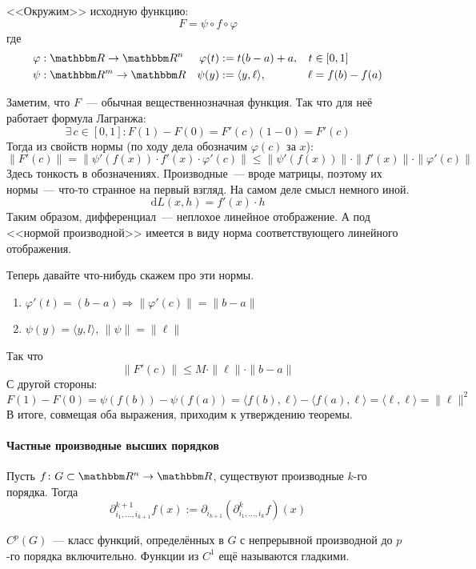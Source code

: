 \documentclass[12pt,timbord]{../../../notes}
\begin{document}
\begin{ittproof}
  <<Окружим>>  исходную функцию:
  \[
    F = \psi \circ f \circ \varphi
  \]
  где 
  \begin{align*}
    \varphi&: \R \to \R^n & \varphi(t) &:= t(b-a) + a, & t&\in [0,1] \\
    \psi&: \R^m \to \R & \psi(y) &:= \langle y, \ell \rangle, & \ell &= f(b)-f(a) 
  \end{align*}
  
  Заметим, что $F$~--- обычная вещественнозначная функция. Так что для неё работает формула
  Лагранжа:
  \[
    \exists\, c \in [0,1] \colon F(1)-F(0) = F'(c)(1-0) = F'(c)
  \]
  Тогда из свойств нормы (по ходу дела обозначим $\varphi(c)$ за $x$):
  \[
    \|F'(c)\| = \|\psi'(f(x)) \cdot f'(x) \cdot \varphi'(c)\| \leqslant 
    \|\psi'(f(x)) \| \cdot \| f'(x) \| \cdot \| \varphi'(c)\|
  \]
  Здесь тонкость в обозначениях. Производные~--- вроде матрицы, поэтому их нормы~--- что-то
  странное на первый взгляд. На самом деле смысл немного иной. 
  \[
    \mathrm d L(x, h) = f'(x) \cdot h
  \]
  Таким образом, дифференциал~--- неплохое линейное отображение. А под <<нормой производной>>
  имеется в виду норма соответствующего линейного отображения.

  Теперь давайте что-нибудь скажем про эти нормы. 

  \begin{enumerate}
    \item $\varphi'(t) = (b-a) \Rightarrow \| \varphi'(c) \| = \| b - a\|$
    \item $\psi(y) = \langle y, l \rangle$, $\| \psi\| = \|\ell\|$      
  \end{enumerate}
  Так что 
  \[
    \| F'(c)\| \leqslant M \cdot \| \ell \| \cdot \|b-a\|
  \]
  С другой стороны:
  \[
    F(1) - F(0) = \psi(f(b)) - \psi(f(a)) = \langle f(b), \ell \rangle - \langle f(a), \ell \rangle
    = \langle \ell, \ell \rangle  = \|\ell \|^2
  \]
  В итоге, совмещая оба выражения, приходим к утверждению теоремы.
\end{ittproof}

\paragraph{Частные производные высших порядков}
\label{par:diffspace::highpartial}

\begin{defn}\label{defn:diffspace::highpartial}
  Пусть $f \colon G \subset \R^n \to \R$, существуют производные $k$-го порядка. Тогда
  \[
    \partial_{i_1, \dotsc, i_{k+1}}^{k+1} f(x) := \partial_{i_{k+1}}(\partial^k_{i_1, \dotsc, i_{k}} f) (x)
  \]
\end{defn}
\begin{rem}\label{rem:diffspace::highpartial::smooth}
  $C^p(G)$~--- класс функций, определённых в $G$ с непрерывной производной до $p$-го порядка
  включительно.
  Функции из $C^1$ ещё называются гладкими.
\end{rem}
\end{document}
